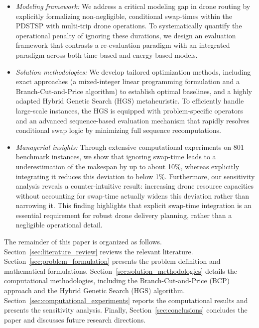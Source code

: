 \documentclass[3p, authoryear, 11pt]{elsarticle}
\begin{document}
\begin{itemize}
    \item \textit{Modeling framework:} We address a critical modeling gap in drone routing by explicitly formalizing non-negligible, conditional swap-times within the PDSTSP with multi-trip drone operations. To systematically quantify the operational penalty of ignoring these durations, we design an evaluation framework that contrasts a re-evaluation paradigm with an integrated paradigm across both time-based and energy-based models.
    
    \item \textit{Solution methodologies:} We develop tailored optimization methods, including exact approaches (a mixed-integer linear programming formulation and a Branch-Cut-and-Price algorithm) to establish optimal baselines, and a highly adapted Hybrid Genetic Search (HGS) metaheuristic. To efficiently handle large-scale instances, the HGS is equipped with problem-specific operators and an advanced sequence-based evaluation mechanism that rapidly resolves conditional swap logic by minimizing full sequence recomputations.

    \item \textit{Managerial insights:} Through extensive computational experiments on 801 benchmark instances, we show that ignoring swap-time leads to a underestimation of the makespan by up to about 10\%, whereas explicitly integrating it reduces this deviation to below 1\%. Furthermore, our sensitivity analysis reveals a counter-intuitive result: increasing drone resource capacities without accounting for swap-time actually widens this deviation rather than narrowing it. This finding highlights that explicit swap-time integration is an essential requirement for robust drone delivery planning, rather than a negligible operational detail.
\end{itemize}

The remainder of this paper is organized as follows. 
Section~\ref{sec:literature_review} reviews the relevant literature. 
Section~\ref{sec:problem_formulation} presents the problem definition and mathematical formulations. Section~\ref{sec:solution_methodologies} details the computational methodologies, including the Branch-Cut-and-Price (BCP) approach and the Hybrid Genetic Search (HGS) algorithm. Section~\ref{sec:computational_experiments} reports the computational results and presents the sensitivity analysis. 
Finally, Section~\ref{sec:conclusions} concludes the paper and discusses future research directions.
\end{document}
